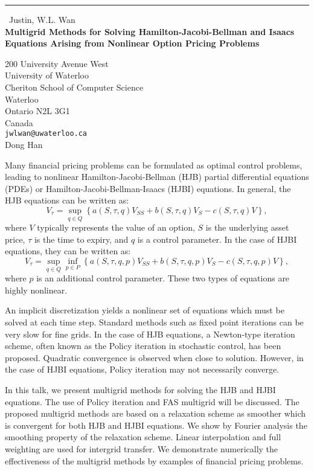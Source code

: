 \documentclass{report}
\begin{document}
\begin{center}
\rule{6in}{1pt} \
{\large Justin, W.L. Wan \\
{\bf Multigrid Methods for Solving Hamilton-Jacobi-Bellman and Isaacs Equations Arising from Nonlinear Option Pricing Problems}}

200 University Avenue West \\ University of Waterloo \\ Cheriton School of Computer Science \\ Waterloo \\ Ontario N2L 3G1 \\ Canada
\\
{\tt jwlwan@uwaterloo.ca}\\
Dong Han\end{center}

Many financial pricing problems can be formulated as optimal control
problems, leading to nonlinear Hamilton-Jacobi-Bellman (HJB) partial
differential equations (PDEs) or Hamilton-Jacobi-Bellman-Isaacs (HJBI)
equations. In general, the HJB equations can be written as:
$$
V_\tau = \sup_{q \in Q} \left\{
a(S,\tau,q) V_{SS} + b(S,\tau,q) V_S - c(S,\tau,q) V \right\},
$$
where $V$ typically represents the value of an option, $S$ is the
underlying asset price, $\tau$ is the time to expiry, and $q$ is a
control parameter. In the case of HJBI equations, they can be written as:
$$
V_\tau = \sup_{q \in Q} \inf_{p \in P} \left\{
a(S,\tau,q,p) V_{SS} + b(S,\tau,q,p) V_S - c(S,\tau,q,p) V \right\},
$$
where $p$ is an additional control parameter. These two types of equations
are highly nonlinear.

An implicit discretization yields a nonlinear set of equations which must
be solved at each time step. Standard methods such as fixed point
iterations can be very slow for fine grids. In the case of HJB equations,
a Newton-type iteration scheme, often known as the Policy iteration in
stochastic control, has been proposed. Quadratic convergence is observed
when close to solution. However, in the case of HJBI equations, Policy
iteration may not necessarily converge.

In this talk, we present multigrid methods for solving the HJB and HJBI
equations. The use of Policy iteration and FAS multigrid will be
discussed. The proposed multigrid methods are based on a relaxation
scheme as smoother which is convergent for both HJB and HJBI equations.
We show by Fourier analysis the smoothing property of the relaxation
scheme. Linear interpolation and full weighting are used for intergrid
transfer. We demonstrate numerically the effectiveness of the multigrid
methods by examples of financial pricing problems.
\end{document}

